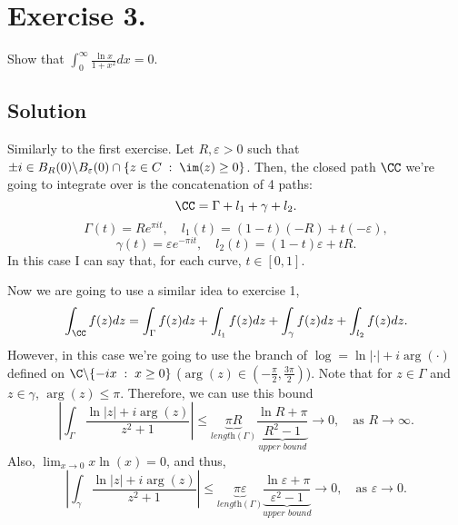 \section*{Exercise 3.}

Show that $\displaystyle \int_0^\infty \frac{\ln x}{1+x^2} dx = 0$.

\subsection*{Solution}

\begin{multicols}{2}
    \begin{figure}[H]
        \centering
        
    \end{figure} 

    Similarly to the first exercise. Let $R,\varepsilon > 0$ such that $\pm i \in B_R(0)\backslash B_\varepsilon(0) \cap \{z\in C \;:\; \im(z) \geq 0\}$. Then, the closed path $\CC$ we're going to integrate over is the concatenation of 4 paths:
    \[ \CC = \Gamma + l_1 + \gamma + l_2. \]
    \[ \Gamma(t) = R e^{\pi i t},\hspace{1em} l_1(t) = (1-t)(-R)+ t (-\varepsilon), \]
    \[ \gamma(t) = \varepsilon e^{-\pi i t}, \hspace{1em} l_2(t) = (1-t)\varepsilon + t R. \]
    In this case I can say that, for each curve, $t \in [0,1]$.
\end{multicols}

Now we are going to use a similar idea to exercise 1,
\[ \int_{\CC} f(z) dz = \int_\Gamma f(z) dz + \int_{l_1} f(z) dz + \int_{\gamma} f(z) dz + \int_{l_2}f(z) dz. \]
However, in this case we're going to use the branch of $\log = \ln |\cdot| + i \arg(\cdot)$ defined on $\C \backslash \{-i x \;:\; x \geq 0\}$ ($\arg(z) \in (-\tfrac{\pi}{2},\tfrac{3\pi}{2})$). Note that for $z\in \Gamma$ and $z\in \gamma$, $\arg(z) \leq \pi$. Therefore, we can use this bound
\[ \left| \int_\Gamma \frac{\ln |z| + i \arg(z)}{z^2 + 1} \right| \leq \underbrace{\pi R}_{\textit{length}(\Gamma)} \underbrace{\frac{\ln R + \pi}{R^2 -1 }}_{\textit{upper bound}} \to 0,\hspace{1em} \mbox{as $R\to \infty$}. \]
Also, $\lim_{x\to 0} x\ln(x) = 0$, and thus,
\[ \left| \int_\gamma \frac{\ln |z| + i \arg(z)}{z^2 + 1} \right| \leq \underbrace{\pi \varepsilon}_{\textit{length}(\Gamma)} \underbrace{\frac{\ln \varepsilon + \pi}{\varepsilon^2 -1 }}_{\textit{upper bound}} \to 0,\hspace{1em} \mbox{as $\varepsilon\to 0$}. \]

